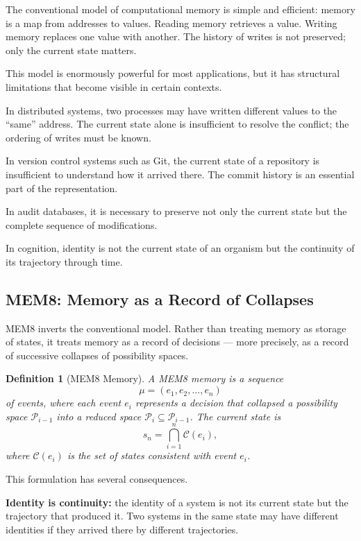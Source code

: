 \documentclass[11pt, a4paper]{article}
\theoremstyle{named}
\newtheorem{definition}{Definition}
\begin{document}
The conventional model of computational memory is simple and
efficient: memory is a map from addresses to values. Reading memory
retrieves a value. Writing memory replaces one value with another.
The history of writes is not preserved; only the current state
matters.

This model is enormously powerful for most applications, but it has
structural limitations that become visible in certain contexts.

In distributed systems, two processes may have written different
values to the ``same'' address. The current state alone is
insufficient to resolve the conflict; the ordering of writes must be
known.

In version control systems such as Git, the current state of a
repository is insufficient to understand how it arrived there. The
commit history is an essential part of the representation.

In audit databases, it is necessary to preserve not only the current
state but the complete sequence of modifications.

In cognition, identity is not the current state of an organism but
the continuity of its trajectory through time.

\subsection{MEM\textbar{}8: Memory as a Record of Collapses}

MEM\textbar{}8 inverts the conventional model. Rather than treating
memory as storage of states, it treats memory as a record of
decisions --- more precisely, as a record of successive collapses of
possibility spaces.

\begin{definition}[MEM\textbar{}8 Memory]
A MEM\textbar{}8 memory is a sequence
\[
  \mu = (e_1, e_2, \ldots, e_n)
\]
of events, where each event $e_i$ represents a decision that collapsed
a possibility space $\mathcal{P}_{i-1}$ into a reduced space
$\mathcal{P}_i \subseteq \mathcal{P}_{i-1}$. The current state is
\[
  s_n = \bigcap_{i=1}^n \mathcal{C}(e_i),
\]
where $\mathcal{C}(e_i)$ is the set of states consistent with
event $e_i$.
\end{definition}

This formulation has several consequences.

\textbf{Identity is continuity:} the identity of a system is not
its current state but the trajectory that produced it. Two systems
in the same state may have different identities if they arrived there
by different trajectories.
\end{document}
